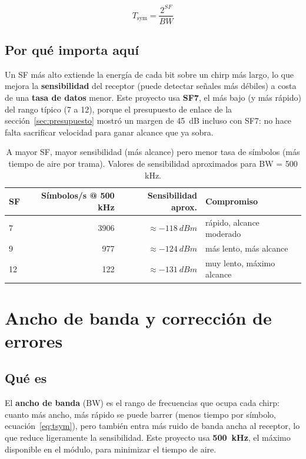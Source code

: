 \begin{equation}
  T_{\text{sym}} = \frac{2^{SF}}{BW}
  \label{eq:tsym}
\end{equation}

\subsection*{Por qué importa aquí}

Un SF más alto extiende la energía de cada bit sobre un chirp más largo, lo que mejora la
\textbf{sensibilidad} del receptor (puede detectar señales más débiles) a costa de una
\textbf{tasa de datos} menor. Este proyecto usa \textbf{SF7}, el más bajo (y más rápido) del
rango típico (7 a 12), porque el presupuesto de enlace de la sección~\ref{sec:presupuesto}
mostró un margen de \SI{45}{dB} incluso con SF7: no hace falta sacrificar velocidad para ganar
alcance que ya sobra.

\begin{table}[h]
  \centering
  \small
  \begin{tabular}{@{}lrrl@{}}
    \toprule
    SF & Símbolos/s @ 500 kHz & Sensibilidad aprox. & Compromiso \\
    \midrule
    7  & \num{3906}  & $\approx \SI{-118}{dBm}$ & rápido, alcance moderado \\
    9  & \num{977}   & $\approx \SI{-124}{dBm}$ & más lento, más alcance \\
    12 & \num{122}   & $\approx \SI{-131}{dBm}$ & muy lento, máximo alcance \\
    \bottomrule
  \end{tabular}
  \caption{A mayor SF, mayor sensibilidad (más alcance) pero menor tasa de símbolos
    (más tiempo de aire por trama). Valores de sensibilidad aproximados para BW = 500 kHz.}
\end{table}

\section{Ancho de banda y corrección de errores}

\subsection*{Qué es}

El \textbf{ancho de banda} (BW) es el rango de frecuencias que ocupa cada chirp: cuanto más
ancho, más rápido se puede barrer (menos tiempo por símbolo, ecuación~\eqref{eq:tsym}), pero
también entra más ruido de banda ancha al receptor, lo que reduce ligeramente la sensibilidad.
Este proyecto usa \textbf{\SI{500}{kHz}}, el máximo disponible en el módulo, para minimizar el
tiempo de aire.


